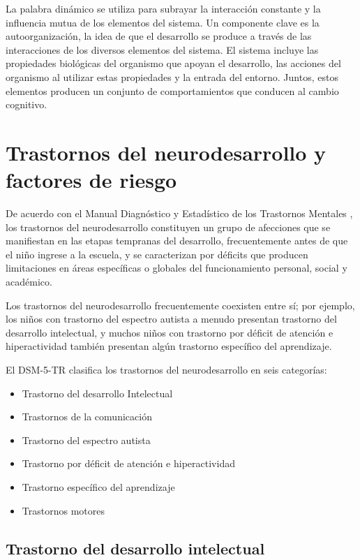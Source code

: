 \documentclass[11pt,letterpaper]{report}
\begin{document}
La palabra dinámico se utiliza para subrayar la interacción constante y la
influencia mutua de los elementos del sistema. Un componente clave es la
autoorganización, la idea de que el desarrollo se produce a través de las
interacciones de los diversos elementos del sistema. El sistema incluye las
propiedades biológicas del organismo que apoyan el desarrollo, las acciones del
organismo al utilizar estas propiedades y la entrada del entorno. Juntos,
estos elementos producen un conjunto de comportamientos que conducen al cambio
cognitivo. \cite{Gauvain2022}

\section{Trastornos del neurodesarrollo y factores de riesgo}
De acuerdo con el Manual Diagnóstico y Estadístico de los Trastornos Mentales
\cite{DSM5TR}, los trastornos del neurodesarrollo constituyen un grupo de 
afecciones que se manifiestan en las etapas tempranas del desarrollo, 
frecuentemente antes de que el niño ingrese a la escuela, y se caracterizan 
por déficits que producen limitaciones en áreas específicas o globales del
funcionamiento personal, social y académico.

Los trastornos del neurodesarrollo frecuentemente coexisten entre sí; por 
ejemplo, los niños con trastorno del espectro autista a menudo presentan 
trastorno del desarrollo intelectual, y muchos niños con trastorno por déficit
de atención e hiperactividad también presentan algún trastorno específico del
aprendizaje. \cite{DSM5TR}

El DSM-5-TR clasifica los trastornos del neurodesarrollo en seis categorías:
    \begin{itemize}
        \item Trastorno del desarrollo Intelectual
        \item Trastornos de la comunicación
        \item Trastorno del espectro autista
        \item Trastorno por déficit de atención e hiperactividad
        \item Trastorno específico del aprendizaje
        \item Trastornos motores
    \end{itemize}

\subsection{Trastorno del desarrollo intelectual}
\end{document}
